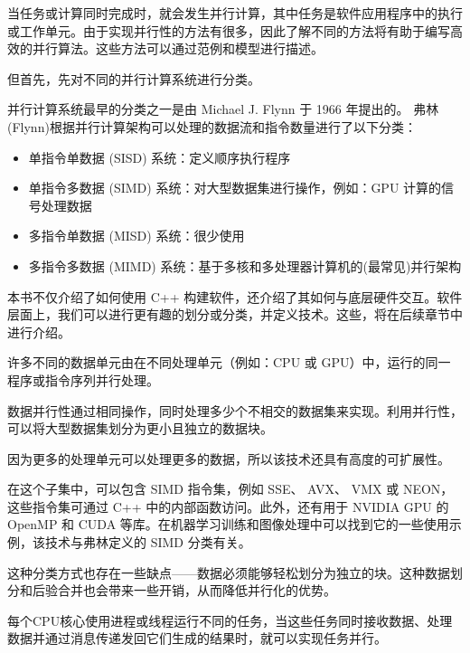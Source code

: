 当任务或计算同时完成时，就会发生并行计算，其中任务是软件应用程序中的执行或工作单元。由于实现并行性的方法有很多，因此了解不同的方法将有助于编写高效的并行算法。这些方法可以通过范例和模型进行描述。

但首先，先对不同的并行计算系统进行分类。


并行计算系统最早的分类之一是由 Michael J. Flynn 于 1966 年提出的。 弗林(Flynn)根据并行计算架构可以处理的数据流和指令数量进行了以下分类：

\begin{itemize}
\item
单指令单数据 (SISD) 系统：定义顺序执行程序

\item
单指令多数据 (SIMD) 系统：对大型数据集进行操作，例如：GPU 计算的信号处理数据

\item
多指令单数据 (MISD) 系统：很少使用

\item
多指令多数据 (MIMD) 系统：基于多核和多处理器计算机的(最常见)并行架构
\end{itemize}


本书不仅介绍了如何使用 C++ 构建软件，还介绍了其如何与底层硬件交互。软件层面上，我们可以进行更有趣的划分或分类，并定义技术。这些，将在后续章节中进行介绍。


许多不同的数据单元由在不同处理单元（例如：CPU 或 GPU）中，运行的同一程序或指令序列并行处理。

数据并行性通过相同操作，同时处理多少个不相交的数据集来实现。利用并行性，可以将大型数据集划分为更小且独立的数据块。

因为更多的处理单元可以处理更多的数据，所以该技术还具有高度的可扩展性。

在这个子集中，可以包含 SIMD 指令集，例如 SSE、 AVX、 VMX 或 NEON，这些指令集可通过 C++ 中的内部函数访问。此外，还有用于 NVIDIA GPU 的 OpenMP 和 CUDA 等库。在机器学习训练和图像处理中可以找到它的一些使用示例，该技术与弗林定义的 SIMD 分类有关。

这种分类方式也存在一些缺点——数据必须能够轻松划分为独立的块。这种数据划分和后验合并也会带来一些开销，从而降低并行化的优势。


每个CPU核心使用进程或线程运行不同的任务，当这些任务同时接收数据、处理数据并通过消息传递发回它们生成的结果时，就可以实现任务并行。

